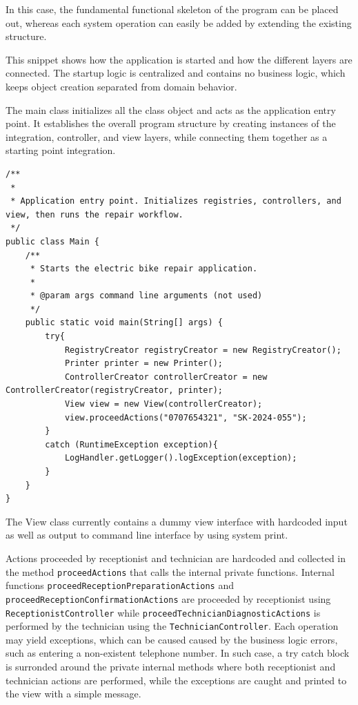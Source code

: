 \documentclass[a4paper]{scrartcl}
\begin{document}
In this case, the fundamental functional skeleton of the program can be placed out, whereas each system operation can easily be added by extending the existing structure.

This snippet shows how the application is started and how the different layers are connected. The startup logic is centralized and contains no business logic, which keeps object creation separated from domain behavior.

The main class initializes all the class object and acts as the application entry point. It establishes the overall program structure by creating instances of the integration, controller, and view layers, while connecting them together as a starting point integration.

\begin{lstlisting}[style=javastyle, caption={Main class and main method entry point}]
/**
 * 
 * Application entry point. Initializes registries, controllers, and view, then runs the repair workflow.
 */
public class Main {
    /**
     * Starts the electric bike repair application.
     *
     * @param args command line arguments (not used)
     */
    public static void main(String[] args) {
        try{
            RegistryCreator registryCreator = new RegistryCreator();
            Printer printer = new Printer();
            ControllerCreator controllerCreator = new ControllerCreator(registryCreator, printer);
            View view = new View(controllerCreator);
            view.proceedActions("0707654321", "SK-2024-055");
        }
        catch (RuntimeException exception){
            LogHandler.getLogger().logException(exception);
        }
    }
}
\end{lstlisting}

The View class currently contains a dummy view interface with hardcoded input as well as output to command line interface by using system print.

Actions proceeded by receptionist and technician are hardcoded and collected in the method \texttt{proceedActions} that calls the internal private functions. Internal functions \texttt{proceedReceptionPreparationActions} and \texttt{proceedReceptionConfirmationActions} are proceeded by receptionist using \texttt{ReceptionistController} while \linebreak\texttt{proceedTechnicianDiagnosticActions} is performed by the technician using the \linebreak\texttt{TechnicianController}. Each operation may yield exceptions, which can be caused caused by the business logic errors, such as entering a non-existent telephone number. In such case, a try catch block is surronded around the private internal methods where both receptionist and technician actions are performed, while the exceptions are caught and printed to the view with a simple message.
\end{document}

